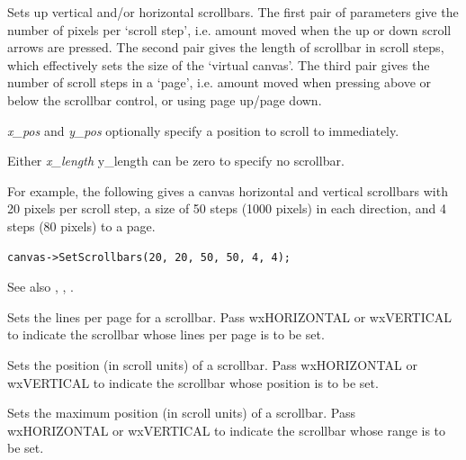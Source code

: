 Sets up vertical and/or horizontal scrollbars. The first pair of
parameters give the number of pixels per `scroll step', i.e. amount
moved when the up or down scroll arrows are pressed.
The second pair gives the length of scrollbar
in scroll steps, which effectively sets the size of the `virtual
canvas'.  The third pair gives the number of scroll steps in a `page',
i.e. amount moved when pressing above or below the scrollbar control,
or using page up/page down.

{\it x\_pos} and {\it y\_pos} optionally specify a position to scroll to immediately.

Either {\it x\_length} {y\_length} can be zero to specify no scrollbar.

For example, the following gives a canvas horizontal and vertical
scrollbars with 20 pixels per scroll step, a size of 50 steps (1000
pixels) in each direction, and 4 steps (80 pixels) to a page.

\begin{verbatim}
canvas->SetScrollbars(20, 20, 50, 50, 4, 4);
\end{verbatim}

See also ,
\rtfsp{}, .

\label{wxcanvassetscrollpage}


Sets the lines per page for a scrollbar. Pass wxHORIZONTAL or wxVERTICAL
to indicate the scrollbar whose lines per page is to be set.

\label{wxcanvassetscrollpos}


Sets the position (in scroll units) of a scrollbar. Pass wxHORIZONTAL or wxVERTICAL
to indicate the scrollbar whose position is to be set.

\label{wxcanvassetscrollrange}


Sets the maximum position (in scroll units) of a scrollbar. Pass wxHORIZONTAL or wxVERTICAL
to indicate the scrollbar whose range is to be set.

